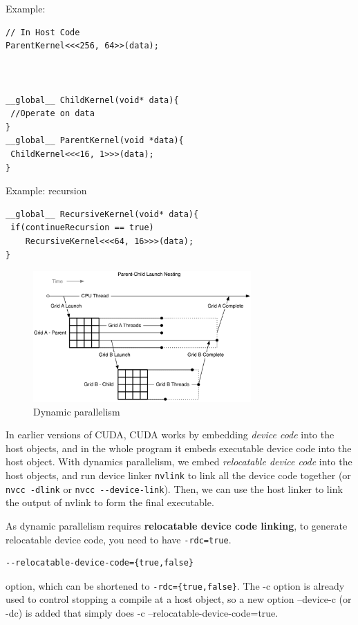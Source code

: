 Example:
\begin{verbatim}
// In Host Code
ParentKernel<<<256, 64>>(data);



__global__ ChildKernel(void* data){
 //Operate on data
}
__global__ ParentKernel(void *data){
 ChildKernel<<<16, 1>>>(data);
}
\end{verbatim}

Example: recursion
\begin{verbatim}
__global__ RecursiveKernel(void* data){
 if(continueRecursion == true)
    RecursiveKernel<<<64, 16>>>(data);
}
\end{verbatim}


\begin{figure}[hbt]
  \centerline{\includegraphics[height=5cm,
    angle=0]{./images/dynamics-parallelism.eps}}
  \caption{Dynamic parallelism}
\label{fig:dynamic-parallelism}
\end{figure}

In earlier versions
of CUDA, CUDA works by embedding {\it device code} into the host objects, and in
the whole program it embeds executable device code into the host object. With
dynamics parallelism, we embed {\it relocatable device code} into the host
objects, and run device linker \verb!nvlink! to link all the device code
together (or \verb!nvcc -dlink! or \verb!nvcc --device-link!). Then, we can use
the host linker to link the output of nvlink to form the final executable.

As dynamic parallelism requires {\bf relocatable device code linking}, to
generate relocatable device code, you need to have \verb!-rdc=true!.
\begin{verbatim}
--relocatable-device-code={true,false} 
\end{verbatim}
option, which can be shortened to \verb!-rdc={true,false}!. The -c option is
already used to control stopping a compile at a host object, so a new option
--device-c (or -dc) is added that simply does -c --relocatable-device-code=true.  


